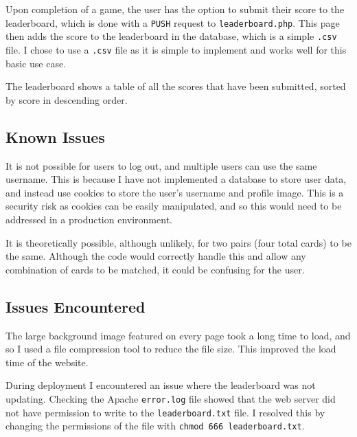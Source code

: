 \documentclass{article}
\begin{document}
Upon completion of a game, the user has the option to submit their score to the leaderboard, which is done with a \texttt{PUSH} request to \texttt{leaderboard.php}. This page then adds the score to the leaderboard in the database, which is a simple \texttt{.csv} file. I chose to use a \texttt{.csv} file as it is simple to implement and works well for this basic use case.

The leaderboard shows a table of all the scores that have been submitted, sorted by score in descending order.

\subsection{Known Issues}
It is not possible for users to log out, and multiple users can use the same username. This is because I have not implemented a database to store user data, and instead use cookies to store the user's username and profile image. This is a security risk as cookies can be easily manipulated, and so this would need to be addressed in a production environment.

It is theoretically possible, although unlikely, for two pairs (four total cards) to be the same. Although the code would correctly handle this and allow any combination of cards to be matched, it could be confusing for the user.

\subsection{Issues Encountered}
The large background image featured on every page took a long time to load, and so I used a file compression tool to reduce the file size. This improved the load time of the website.

During deployment I encountered an issue where the leaderboard was not updating. Checking the Apache \texttt{error.log} file showed that the web server did not have permission to write to the \texttt{leaderboard.txt} file. I resolved this by changing the permissions of the file with \texttt{chmod 666 leaderboard.txt}.
\end{document}
